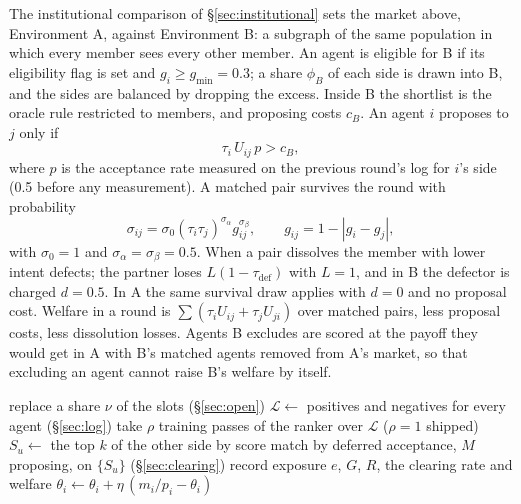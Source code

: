 The institutional comparison of \S\ref{sec:institutional} sets the market above,
Environment A, against Environment B: a subgraph of the same population in which
every member sees every other member. An agent is eligible for B if its
eligibility flag is set and $g_i \ge g_{\min} = 0.3$; a share $\phi_B$ of each
side is drawn into B, and the sides are balanced by dropping the excess. Inside B
the shortlist is the oracle rule restricted to members, and proposing costs
$c_B$. An agent $i$ proposes to $j$ only if
\begin{equation}
\tau_i\, U_{ij}\, p > c_B,
\label{eq:signal}
\end{equation}
where $p$ is the acceptance rate measured on the previous round's log for $i$'s
side (0.5 before any measurement). A matched pair survives the round with
probability
\begin{equation}
\sigma_{ij} = \sigma_0 (\tau_i \tau_j)^{\sigma_\alpha} g_{ij}^{\sigma_\beta},
\qquad g_{ij} = 1 - |g_i - g_j|,
\label{eq:survival}
\end{equation}
with $\sigma_0 = 1$ and $\sigma_\alpha = \sigma_\beta = 0.5$. When a pair dissolves
the member with lower intent defects; the partner loses $L(1 - \tau_{\mathrm{def}})$
with $L = 1$, and in B the defector is charged $d = 0.5$. In A the same survival
draw applies with $d = 0$ and no proposal cost. Welfare in a round is $\sum (\tau_i
U_{ij} + \tau_j U_{ji})$ over matched pairs, less proposal costs, less dissolution
losses. Agents B excludes are scored at the payoff they would get in A with B's
matched agents removed from A's market, so that excluding an agent cannot raise
B's welfare by itself.

\begin{algorithm}[t]
\caption{One round $r$ of the market. $\mathcal{L}$ is the round's training log.}
\label{alg:round}
\begin{algorithmic}[1]
 replace a share $\nu$ of the slots (\S\ref{sec:open})
\EndIf
\State $\mathcal{L} \gets$ positives and negatives for every agent (\S\ref{sec:log})
\State take $\rho$ training passes of the ranker over $\mathcal{L}$ ($\rho = 1$ shipped)
  \State $S_u \gets$ the top $k$ of the other side by score
\EndFor
\State match by deferred acceptance, $M$ proposing, on $\{S_u\}$ (\S\ref{sec:clearing})
\State record exposure $e$, $G$, $R$, the clearing rate and welfare
  \State $\theta_i \gets \theta_i + \eta\,(m_i/p_i - \theta_i)$
\EndFor
\end{algorithmic}
\end{algorithm}

\begin{table}[t]
\centering

\caption{Every parameter of the model, with its value in the shipped
configuration and the values swept. All are modeling choices: none is estimated
from data. The swept values are those of the sensitivity sweep
(\S\ref{sec:where}), the dose, exploration and population-size experiments
(\S\ref{sec:what-ends}) and the open market (\S\ref{sec:arrivals}).}
\label{tab:params}
\end{table}
